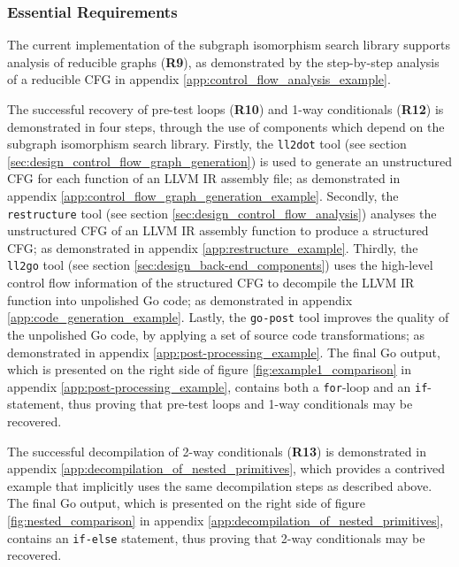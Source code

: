 
\subsubsection{Essential Requirements}
\label{sec:eval_control_flow_analysis_library_essential_requirements}


The current implementation of the subgraph isomorphism search library supports analysis of reducible graphs (\textbf{R9}), as demonstrated by the step-by-step analysis of a reducible CFG in appendix \ref{app:control_flow_analysis_example}.


The successful recovery of pre-test loops (\textbf{R10}) and 1-way conditionals (\textbf{R12}) is demonstrated in four steps, through the use of components which depend on the subgraph isomorphism search library. Firstly, the \texttt{ll2dot} tool (see section \ref{sec:design_control_flow_graph_generation}) is used to generate an unstructured CFG for each function of an LLVM IR assembly file; as demonstrated in appendix \ref{app:control_flow_graph_generation_example}. Secondly, the \texttt{restructure} tool (see section \ref{sec:design_control_flow_analysis}) analyses the unstructured CFG of an LLVM IR assembly function to produce a structured CFG; as demonstrated in appendix \ref{app:restructure_example}. Thirdly, the \texttt{ll2go} tool (see section \ref{sec:design_back-end_components}) uses the high-level control flow information of the structured CFG to decompile the LLVM IR function into unpolished Go code; as demonstrated in appendix \ref{app:code_generation_example}. Lastly, the \texttt{go-post} tool improves the quality of the unpolished Go code, by applying a set of source code transformations; as demonstrated in appendix \ref{app:post-processing_example}. The final Go output, which is presented on the right side of figure \ref{fig:example1_comparison} in appendix \ref{app:post-processing_example}, contains both a \texttt{for}-loop and an \texttt{if}-statement, thus proving that pre-test loops and 1-way conditionals may be recovered.


The successful decompilation of 2-way conditionals (\textbf{R13}) is demonstrated in appendix \ref{app:decompilation_of_nested_primitives}, which provides a contrived example that implicitly uses the same decompilation steps as described above. The final Go output, which is presented on the right side of figure \ref{fig:nested_comparison} in appendix \ref{app:decompilation_of_nested_primitives}, contains an \texttt{if-else} statement, thus proving that 2-way conditionals may be recovered.

